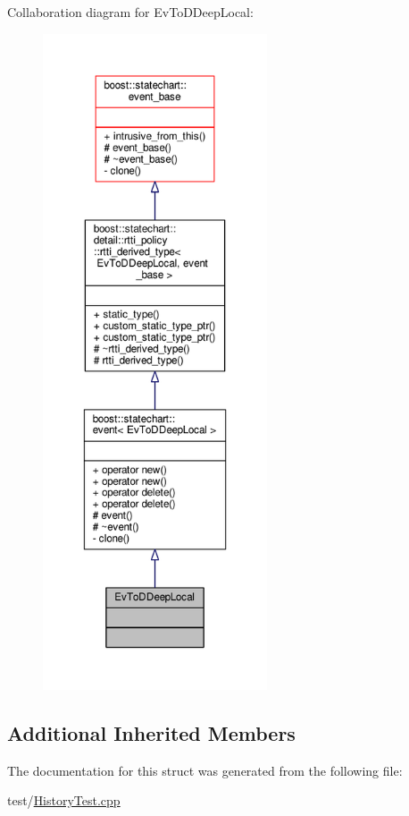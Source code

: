 Collaboration diagram for Ev\+To\+D\+Deep\+Local\+:
\nopagebreak
\begin{figure}[H]
\begin{center}
\leavevmode
\includegraphics[height=550pt]{struct_ev_to_d_deep_local__coll__graph}
\end{center}
\end{figure}
\subsection*{Additional Inherited Members}


The documentation for this struct was generated from the following file\+:\begin{DoxyCompactItemize}
\item 
test/\mbox{\hyperlink{_history_test_8cpp}{History\+Test.\+cpp}}\end{DoxyCompactItemize}

